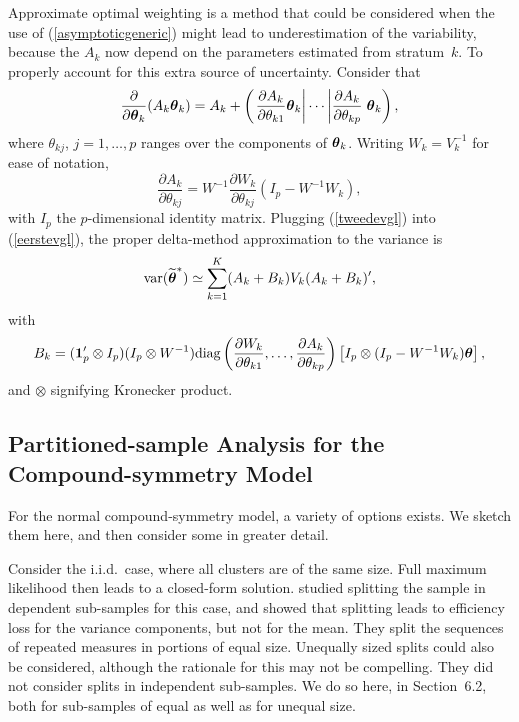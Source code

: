 \documentclass[11pt,a5paper,twoside]{book}
\newcommand{\bftheta}{\mbox{\boldmath $\theta$}}
\begin{document}
Approximate optimal weighting is a method that could be considered when
the use of  (\ref{asymptoticgeneric}) might lead to underestimation of the 
variability, because the $A_k$ now depend on the parameters 
estimated from stratum~$k$. To properly account for this 
extra source of uncertainty. Consider that
\begin{equation}
\label{eerstevgl}
\frac{\partial}{\partial\bftheta_k}(A_k\bftheta_k)=A_k+
\left(
\left.
\frac{\partial A_k}{\partial\theta_{k1}}\bftheta_k\right|
\cdots
\left|
\frac{\partial A_k}{\partial\theta_{kp}}
\right.\bftheta_k
\right),
\end{equation}
where $\theta_{kj}$, $j=1,\dots,p$ ranges over the components of 
$\bftheta_k$.  Writing $W_k=V_k^{-1}$ for ease of notation,
\begin{equation}
\frac{\partial A_k}{\partial\theta_{kj}}=W^{-1}\frac{\partial W_k}{\partial\theta_{kj}}(I_p-W^{-1}W_k),
\label{tweedevgl}
\end{equation}
with $I_p$ the $p$-dimensional identity matrix. Plugging (\ref{tweedevgl}) 
into (\ref{eerstevgl}), the proper delta-method approximation to the 
variance is
\begin{equation}
\label{asymptoticgenerictwee}
\mbox{var}(\widetilde{\bftheta}^*)\simeq
\sum_{k=1}^K(A_k+B_k)V_k(A_k+B_k)',
\end{equation}
with
$$
B_k=(\mbox{\bfseries 1}_p'\otimes I_p)(I_p\otimes W^{-1})\mbox{diag}\left(
\frac{\partial W_k}{\partial\theta_{k1}},\dots,
\frac{\partial A_k}{\partial\theta_{kp}}
\right)
\left[I_p\otimes(I_p-W^{-1}W_k)\bftheta\right],
$$
and $\otimes$ signifying Kronecker product.



\subsection{Partitioned-sample Analysis for the Compound-symmetry Model}
\label{psa7}

For the normal compound-symmetry model,
a variety of options exists. We  sketch them here, and then 
consider some in greater detail.

Consider the i.i.d.\ case, where all clusters are of the same size. 
Full maximum likelihood then leads to a closed-form solution. \cite{Iddi2011} 
studied splitting the sample in dependent sub-samples for this case, and 
showed that splitting leads to efficiency loss for the variance 
components, but not for the mean. They split the sequences of repeated 
measures in portions of equal size. Unequally sized splits 
could also be considered, although the rationale for this may not be 
compelling. They did not consider splits in independent sub-samples. 
We do so here, in Section~6.2,
both for sub-samples 
of equal as well as for unequal size.
\end{document}
